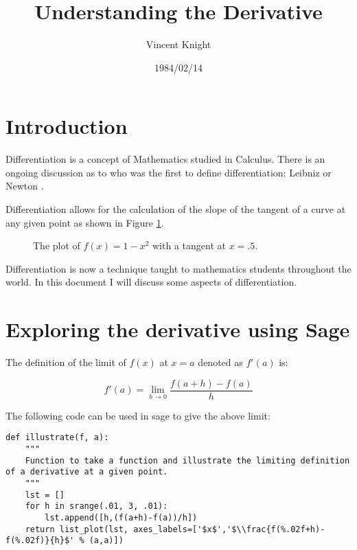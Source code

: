 \documentclass[a4paper]{article}
\title{Understanding the Derivative}
\author{Vincent Knight}
\date{1984/02/14}
\begin{document}
\maketitle

\section{Introduction}

Differentiation is a concept of Mathematics studied in Calculus. There is an ongoing discussion as to who was the first to define differentiation: Leibniz or Newton \cite{bardi2006calculus}.

Differentiation allows for the calculation of the slope of the tangent of a curve at any given point as shown in Figure \ref{exampleplot}.

\begin{figure}[!htbp]
\begin{center}
\end{center}
\caption{The plot of $f(x)=1-x^2$ with a tangent at $x=.5$.}\label{exampleplot}
\end{figure}

Differentiation is now a technique taught to mathematics students throughout the world. In this document I will discuss some aspects of differentiation.

\section{Exploring the derivative using Sage}

The definition of the limit of $f(x)$ at $x=a$ denoted as $f'(a)$ is:

\begin{equation}
f'(a) = \lim_{h\to0}\frac{f(a+h)-f(a)}{h}
\end{equation}

The following code can be used in sage to give the above limit:

\begin{verbatim}
def illustrate(f, a):
    """
    Function to take a function and illustrate the limiting definition of a derivative at a given point.
    """
    lst = []
    for h in srange(.01, 3, .01):
        lst.append([h,(f(a+h)-f(a))/h])
    return list_plot(lst, axes_labels=['$x$','$\\frac{f(%.02f+h)-f(%.02f)}{h}$' % (a,a)])
\end{verbatim}
\end{document}
